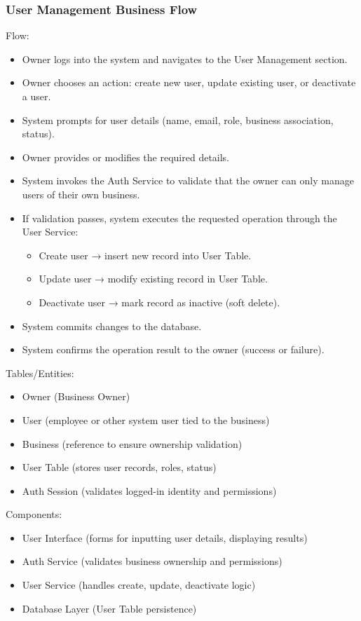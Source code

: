 \documentclass[]{VUMIFTemplateClass}
\begin{document}
\newpage
\subsubsection{User Management Business Flow}

Flow:
\begin{itemize}
\setlength{\itemsep}{2pt}
\setlength{\parskip}{0pt}
\setlength{\parsep}{0pt}
\item Owner logs into the system and navigates to the User Management section.
\item Owner chooses an action: create new user, update existing user, or deactivate a user.
\item System prompts for user details (name, email, role, business association, status).
\item Owner provides or modifies the required details.
\item System invokes the Auth Service to validate that the owner can only manage users of their own business.
\item If validation passes, system executes the requested operation through the User Service:
\begin{itemize}
\item Create user → insert new record into User Table.
\item Update user → modify existing record in User Table.
\item Deactivate user → mark record as inactive (soft delete).
\end{itemize}
\item System commits changes to the database.
\item System confirms the operation result to the owner (success or failure).
\end{itemize}

Tables/Entities:
\begin{itemize}
\setlength{\itemsep}{2pt}
\setlength{\parskip}{0pt}
\setlength{\parsep}{0pt}
\item Owner (Business Owner)
\item User (employee or other system user tied to the business)
\item Business (reference to ensure ownership validation)
\item User Table (stores user records, roles, status)
\item Auth Session (validates logged-in identity and permissions)
\end{itemize}

Components:
\begin{itemize}
\setlength{\itemsep}{2pt}
\setlength{\parskip}{0pt}
\setlength{\parsep}{0pt}
\item User Interface (forms for inputting user details, displaying results)
\item Auth Service (validates business ownership and permissions)
\item User Service (handles create, update, deactivate logic)
\item Database Layer (User Table persistence)
\end{itemize}
\end{document}
